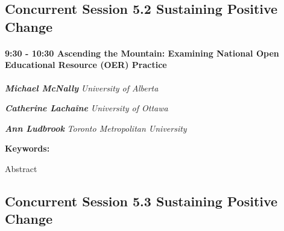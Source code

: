 \documentclass[
]{book}
\begin{document}
\hypertarget{concurrent-session-5.2-sustaining-positive-change}{%
\subsection*{Concurrent Session 5.2 \textbar{} Sustaining Positive Change}\label{concurrent-session-5.2-sustaining-positive-change}}

\begin{session}
\hypertarget{ascending-the-mountain-examining-national-open-educational-resource-oer-practice}{%
\paragraph*{\texorpdfstring{9:30 - 10:30 \textbar{} \textbf{Ascending
the Mountain: Examining National Open Educational Resource (OER)}
\textbar{}
Practice}{9:30 - 10:30 \textbar{} Ascending the Mountain: Examining National Open Educational Resource (OER) \textbar{} Practice}}\label{ascending-the-mountain-examining-national-open-educational-resource-oer-practice}}

\textbf{\emph{Michael McNally}} \textbar{} \emph{University of Alberta}

\textbf{\emph{Catherine Lachaîne}} \textbar{} \emph{University of
Ottawa}

\textbf{\emph{Ann Ludbrook}} \textbar{} \emph{Toronto Metropolitan
University}

\textbf{Keywords:}

Abstract
\end{session}

\hypertarget{concurrent-session-5.3-sustaining-positive-change}{%
\subsection*{Concurrent Session 5.3 \textbar{} Sustaining Positive Change}\label{concurrent-session-5.3-sustaining-positive-change}}
\end{document}
